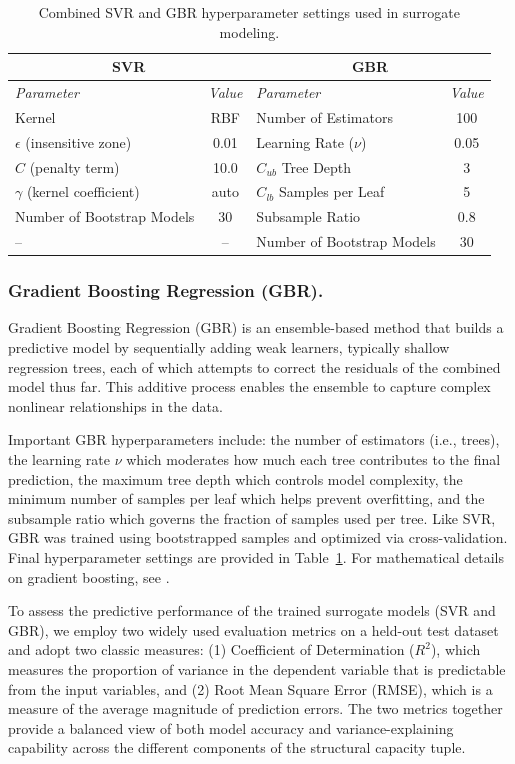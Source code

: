 \documentclass[authoryear,preprint,review,12pt]{elsarticle}
\begin{document}
\begin{table}[htbp]
\centering
\caption{Combined SVR and GBR hyperparameter settings used in surrogate modeling.}
\label{tab:surrogate_hyperparams}
\begin{tabular}{|l|c|l|c|}
\hline
\multicolumn{2}{|c|}{\textbf{SVR}} & \multicolumn{2}{c|}{\textbf{GBR}} \\
\hline
\textit{Parameter} & \textit{Value} & \textit{Parameter} & \textit{Value} \\
\hline
Kernel & RBF & Number of Estimators & 100 \\
$\epsilon$ (insensitive zone) & 0.01 & Learning Rate ($\nu$) & 0.05 \\
$C$ (penalty term) & 10.0 & $C_{ub}$ Tree Depth & 3 \\
$\gamma$ (kernel coefficient) & auto & $C_{lb}$ Samples per Leaf & 5 \\
Number of Bootstrap Models & 30 & Subsample Ratio & 0.8 \\
-- & -- & Number of Bootstrap Models & 30 \\
\hline
\end{tabular}
\end{table}

\subsubsection{Gradient Boosting Regression (GBR).}
Gradient Boosting Regression (GBR) is an ensemble-based method that builds a predictive model by sequentially adding weak learners, typically shallow regression trees, each of which attempts to correct the residuals of the combined model thus far. This additive process enables the ensemble to capture complex nonlinear relationships in the data.

Important GBR hyperparameters include: the number of estimators (i.e., trees), the learning rate $\nu$ which moderates how much each tree contributes to the final prediction, the maximum tree depth which controls model complexity, the minimum number of samples per leaf which helps prevent overfitting, and the subsample ratio which governs the fraction of samples used per tree. Like SVR, GBR was trained using bootstrapped samples and optimized via cross-validation. Final hyperparameter settings are provided in Table~\ref{tab:surrogate_hyperparams}. For mathematical details on gradient boosting, see \citep{Friedman2001GBR}.


To assess the predictive performance of the trained surrogate models (SVR and GBR), we employ two widely used evaluation metrics on a held-out test dataset and adopt two classic measures: (1) {Coefficient of Determination ($R^2$)}, which measures the proportion of variance in the dependent variable that is predictable from the input variables, and (2) {Root Mean Square Error (RMSE)}, which is a measure of the average magnitude of prediction errors. The two metrics together provide a balanced view of both model accuracy and variance-explaining capability across the different components of the structural capacity tuple.
\end{document}
